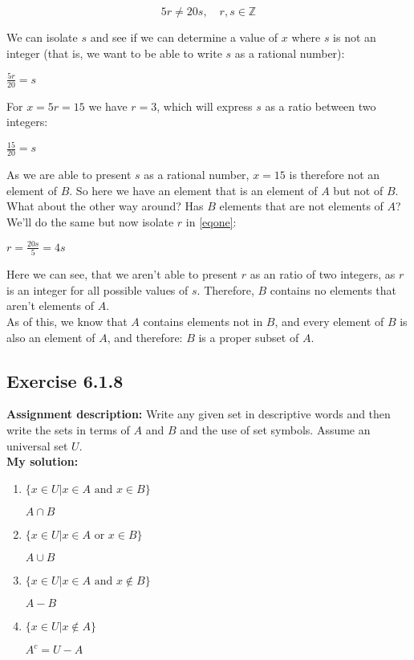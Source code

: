 \documentclass{article}
\newcommand{\cent}[1]{\begin{center}#1\end{center}}
\newcommand{\mat}[2]{\begin{equation} \label{#2}#1\end{equation}}
\newcommand{\doubleZ}{\mathbb{Z}}
\newcommand{\In}{\! \in \!}
\newcommand{\Assign}{\textbf{Assignment description: }}
\newcommand{\Solution}{\textbf{My solution: }}
\newcommand{\QED}{\boxed{}}
\newcommand{\Exercise}[1]{\subsection*{Exercise #1}}
\begin{document}
	\mat{5r\neq20s, \quad r,s \In \doubleZ}{eqone}
	
	We can isolate $s$ and see if we can determine a value of $x$ where $s$ is not an integer (that is, we want to be able to write $s$ as a rational number):
	
	\cent{$\frac{5r}{20} = s$}
	
	For $x = 5r=15$ we have $r=3$, which will express $s$ as a ratio between two integers:
	
	\cent{$\frac{15}{20} = s$}
	
	As we are able to present $s$ as a rational number, $x=15$ is therefore not an element of $B$. So here we have an element that is an element of $A$ but not of $B$. What about the other way around? Has $B$ elements that are not elements of $A$? We'll do the same but now isolate $r$ in \eqref{eqone}:
	
	\cent{$r = \frac{20s}{5} = 4s $}
	
	Here we can see, that we aren't able to present $r$ as an ratio of two integers, as $r$ is an integer for all possible values of $s$. Therefore, $B$ contains no elements that aren't elements of $A$.\\
	
	As of this, we know that $A$ contains elements not in $B$, and every element of $B$ is also an element of $A$, and therefore: $B$ is a proper subset of $A$.\\
	\QED
	
	\Exercise{6.1.8}
	
	\Assign
	Write any given set in descriptive words and then write the sets in terms of $A$ and $B$ and the use of set symbols. Assume an universal set $U$.\\
	
	\Solution
	\begin{enumerate}[label=\textbf{\Alph*.}]
		\item $\{x \in U | x \In A \text{ and } x \In B\}$
		
		\cent{$A \cap B$}
		
		\item $\{x \In U | x \In A \text{ or } x \In B\}$
		
		\cent{$A \cup B$}
		
		\item $\{x \In U | x \In A \text{ and } x \notin B \}$
		
		\cent{$A - B$}
		
		\item $\{x \In U | x \notin A \}$
		
		\cent{$A^c = U - A$}
		
		\end{enumerate}
		
\end{document}
